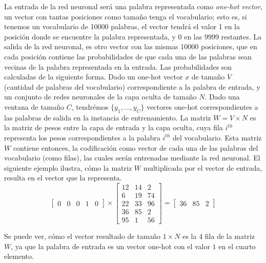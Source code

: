 \bigskip La entrada de la red neuronal será una palabra representada como \textit{one-hot vector}, un vector con tantas posiciones como tamaño tenga el vocabulario; esto es, si tenemos un vocabulario de 10000 palabras, el vector tendrá el valor 1 en la posición donde se encuentre la palabra representada, y 0 en las 9999 restantes. La salida de la red neuronal, es otro vector con las mismas 10000 posiciones, que en cada posición contiene las probabilidades de que cada una de las palabras sean vecinas de la palabra representada en la entrada. Las probabilidades son calculadas de la siguiente forma. Dado un one-hot vector \(x\) de tamaño \(V\) (cantidad de palabras del vocabulario) correspondiente a la palabra de entrada, y un conjunto de redes neuronales de la capa oculta de tamaño \(N\). Dado una ventana de tamaño \(C\), tendrémos \(\{y_1,...,y_C\}\) vectores one-hot correspondientes a las palabras de salida en la instancia de entrenamiento. La matriz \(W=V \times N\) es la matriz de pesos entre la capa de entrada y la capa oculta, cuya fila \(i^{th}\) representa los pesos correspondientes a la palabra \(i^{th}\) del vocabulario. Esta matriz \(W\) contiene entonces, la codificación como vector de cada una de las palabras del vocabulario (como filas), las cuales serán entrenadas mediante la red neuronal. El siguiente ejemplo ilustra, cómo la matriz \(W\) multiplicada por el vector de entrada, resulta en el vector que la representa.
\[\begin{bmatrix}0 & 0 & 0 & 1 & 0 \end{bmatrix} \times  \begin{bmatrix}12 & 14 & 2 \\ 6 & 19 & 74 \\ 22 & 33 & 96 \\ 36 & 85 & 2 \\ 95 & 1 & 56 \end{bmatrix} = \begin{bmatrix} 36 & 85 & 2 \end{bmatrix}\]

Se puede ver, cómo el vector resultado de tamaño \(1 \times N\) es la 4 fila de la matriz \(W\), ya que la palabra de entrada es un vector one-hot con el valor \(1\) en el cuarto elemento.

